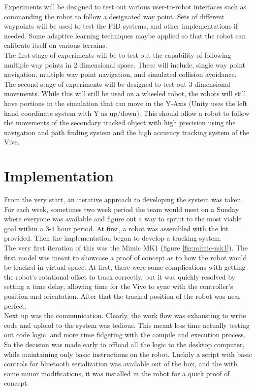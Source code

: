 \documentclass[10pt,a4paper]{article}
\begin{document}
	Experiments will be designed to test out various user-to-robot interfaces such as commanding the robot to follow a designated way point. Sets of different waypoints will be used to test the PID systems, and other implementations if needed. Some adaptive learning techniques maybe applied so that the robot can calibrate itself on various terrains.
	\\ 
	The first stage of experiments will be to test out the capability of following multiple way points in 2 dimensional space. These will include, single way point navigation, multiple way point navigation, and simulated collision avoidance.
	\\ 
	The second stage of experiments will be designed to test out 3 dimensional movements. While this will still be used on a wheeled robot, the robots will still have portions in the simulation that can move in the Y-Axis (Unity uses the left hand coordinate system with Y as up/down). This should allow a robot to follow the movements of the secondary tracked object with high precision using the navigation and path finding system and the high accuracy tracking system of the Vive.
	
	\section*{Implementation}
	From the very start, an iterative approach to developing the system was taken. For each week, sometimes two week period the team would meet on a Sunday where everyone was available and figure out a way to sprint to the most viable goal within a 3-4 hour period. At first, a robot was assembled with the kit provided. Then the implementation began to develop a tracking system.
	\\
	The very first iteration of this was the Mimic MK1 (figure \ref{fig:mimic-mk1}). The first model was meant to showcase a proof of concept as to how the robot would be tracked in virtual space. At first, there were some complications with getting the robot's rotational offset to track correctly, but it was quickly resolved by setting a time delay, allowing time for the Vive to sync with the controller's position and orientation. After that the tracked position of the robot was near perfect.
	\\
	Next up was the communication. Clearly, the work flow was exhausting to write code and upload to the system was tedious. This meant less time actually testing out code logic, and more time fidgeting with the compile and execution process. So the decision was made early to offload all the logic to the desktop computer, while maintaining only basic instructions on the robot. Luckily a script with basic controls for bluetooth serialization was available out of the box, and the with some minor modifications, it was installed in the robot for a quick proof of concept.
		
\end{document}
